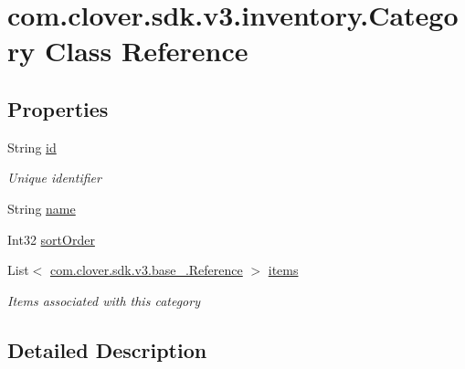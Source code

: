\hypertarget{classcom_1_1clover_1_1sdk_1_1v3_1_1inventory_1_1_category}{}\section{com.\+clover.\+sdk.\+v3.\+inventory.\+Category Class Reference}
\label{classcom_1_1clover_1_1sdk_1_1v3_1_1inventory_1_1_category}
\subsection*{Properties}
\begin{DoxyCompactItemize}
\item 
String \hyperlink{classcom_1_1clover_1_1sdk_1_1v3_1_1inventory_1_1_category_a72460c1defbe900b33ba38b515419b16}{id}
\begin{DoxyCompactList}\small\item\em Unique identifier \end{DoxyCompactList}\item 
String \hyperlink{classcom_1_1clover_1_1sdk_1_1v3_1_1inventory_1_1_category_aa2bb94f5244c32fa288756a1626ddd39}{name}
\item 
Int32 \hyperlink{classcom_1_1clover_1_1sdk_1_1v3_1_1inventory_1_1_category_ad31249c22be586f1a5be0af32453885c}{sort\+Order}
\item 
List$<$ \hyperlink{classcom_1_1clover_1_1sdk_1_1v3_1_1base___1_1_reference}{com.\+clover.\+sdk.\+v3.\+base\+\_\+.\+Reference} $>$ \hyperlink{classcom_1_1clover_1_1sdk_1_1v3_1_1inventory_1_1_category_a5ed1fac5d4c5898b9fea25fc3bbddd0f}{items}
\begin{DoxyCompactList}\small\item\em Items associated with this category \end{DoxyCompactList}\end{DoxyCompactItemize}


\subsection{Detailed Description}



